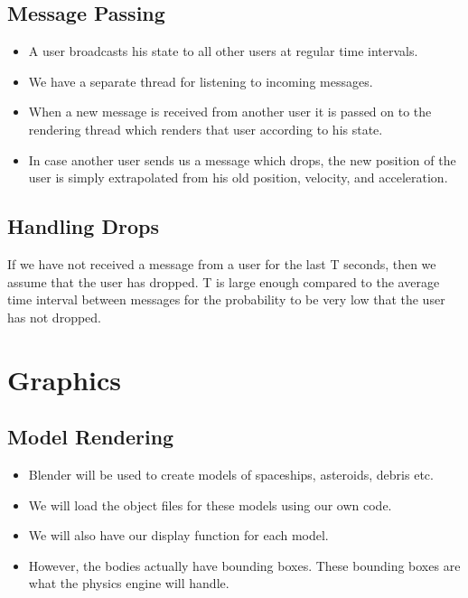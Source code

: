 \documentclass[]{article}
\begin{document}
\subsection{Message Passing}
\begin{itemize}
\item A user broadcasts his state to all other users at regular time intervals.
\item We have a separate thread for listening to incoming messages. 
\item When a new message is received from another user it is passed on to the rendering thread which renders that user according to his state.
\item In case another user sends us a message which drops, the new position of the user is simply extrapolated from his old position, velocity, and acceleration.
\end{itemize}
\subsection{Handling Drops}
If we have not received a message from a user for the last T seconds, then we assume that the user has dropped. T is large enough compared to the average time interval between messages for the probability to be very low that the user has not dropped.
\section{Graphics}
\subsection{Model Rendering}
\begin{itemize}
\item Blender will be used to create models of spaceships, asteroids, debris etc.
\item We will load the object files for these models using our own code.
\item We will also have our display function for each model.
\item However, the bodies actually have bounding boxes. These bounding boxes are what the physics engine will handle.
\end{itemize}
\end{document}
